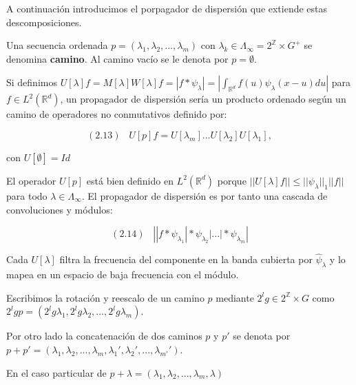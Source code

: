 \medskip

\noindent A continuación introducimos el porpagador de dispersión que extiende estas descomposiciones.

\medskip

\begin{definicion}
Una secuencia ordenada $p=(\lambda_1,\lambda_2, ... , \lambda_m)$ con $\lambda_k \in \Lambda_\infty=2^{\mathbb{Z}} \times G^{+} $ se denomina \textbf{camino}. Al camino vacío se le denota por $p=\emptyset$. 
\end{definicion}


\begin{definicion}
Si definimos $U[\lambda]f=M[\lambda]W[\lambda]f=|f \ast \psi_\lambda|=\left | \int_{\mathbb{R}^d} f(u)\psi_\lambda(x-u) du \right|$ para $f \in L^2(\mathbb{R}^d)$, un propagador de dispersión sería un producto ordenado según un camino de operadores no conmutativos definido por:

$$(2.13) \;\;\; U[p]f=U[\lambda_m]...U[\lambda_2]U[\lambda_1],$$

con $U[\emptyset]=Id$
\end{definicion}

\medskip

\noindent El operador $U[p]$ está bien definido en $L^2(\mathbb{R}^d)$ porque $\left|\left| U[\lambda]f \right|\right| \leq ||\psi_\lambda||_1 ||f||$ para todo $\lambda \in \Lambda_\infty$. El propagador de dispersión es por tanto una cascada de convoluciones y módulos: 

$$(2.14) \;\;\; \left| |f \ast \psi_{\lambda_1} | \ast \psi_{\lambda_2} | ... | \ast \psi_{\lambda_m} \right|$$

\medskip

\noindent Cada $U[\lambda]$ filtra la frecuencia del componente en la banda cubierta por $\widehat{\psi}_\lambda$ y lo mapea en un espacio de baja frecuencia con el módulo.

\begin{definicion}
Escribimos la rotación y reescalo de un camino $p$ mediante $2^lg \in 2^\mathbb{Z}\times G$ como $2^lgp=(2^lg\lambda_1,2^lg\lambda_2,...,2^lg\lambda_m)$.
\end{definicion}

\begin{definicion}
Por otro lado la concatenación de dos caminos $p$ y $p'$ se denota por $p+p'=(\lambda_1,\lambda_2,...,\lambda_m,\lambda_1',\lambda_2',...,\lambda_{m'}')$. 

En el caso particular de $p+\lambda=(\lambda_1,\lambda_2,...,\lambda_m,\lambda)$
\end{definicion}

